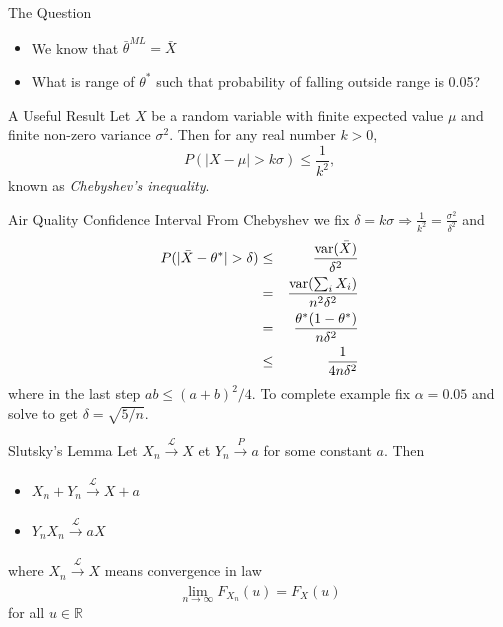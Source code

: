 \documentclass{beamer}
\begin{document}
 \begin{frame}{The Question}  
 \begin{itemize} 
  \item We know that $\bar{\theta}^{ML} = \bar{X}$ 
  \item What is range of $\theta^*$ such that probability of falling outside range is 0.05? 
 \end{itemize}
 \end{frame}

\begin{frame}{A Useful Result} 
Let $X$ be a random variable with finite expected value $\mu$ and finite non-zero variance $\sigma^2$. Then for any real number $k > 0$, 
\begin{displaymath} 
 P(|X - \mu| > k \sigma) \leq \frac{1}{k^2},
\end{displaymath}
known as \emph{Chebyshev's inequality}. 
\end{frame}

\begin{frame}{Air Quality Confidence Interval}  
From  Chebyshev we fix $\delta = k\sigma \Rightarrow \frac{1}{k^2} = \frac{\sigma^2}{\delta^2}$ and 
\begin{eqnarray*} 
 P(|\bar{X} - \theta^*| > \delta) &\leq& \frac{\mbox{var}(\bar{X})}{\delta^2} \\
&=& \frac{\mbox{var}(\sum_i X_i)}{n^2\delta^2} \\ 
&=& \frac{\theta^*(1 - \theta^*)}{n\delta^2}  \\ 
&\leq& \frac{1}{4n\delta^2}  
\end{eqnarray*}
where in the last step $ab \leq (a+b)^2/4$. To complete example fix $\alpha = 0.05$ and solve to get $\delta = \sqrt{5/n}$. 
\end{frame}

\begin{frame}{Slutsky's Lemma} 
Let $X_n \xrightarrow[]{\mathcal{L}} X$ et $Y_n \xrightarrow[]{P} a$ for some constant $a$. Then 
\begin{itemize} 
 \item $X_n + Y_n \xrightarrow[]{\mathcal{L}} X + a$
 \item $Y_nX_n \xrightarrow[]{\mathcal{L}} aX$ 
\end{itemize}
where $X_n \xrightarrow[]{\mathcal{L}} X$ means convergence in law 
\begin{displaymath} 
\lim_{n\rightarrow\infty} F_{X_n}(u) = F_X(u)
\end{displaymath}
for all $u \in \mathbb{R}$
\end{frame}
\end{document}
